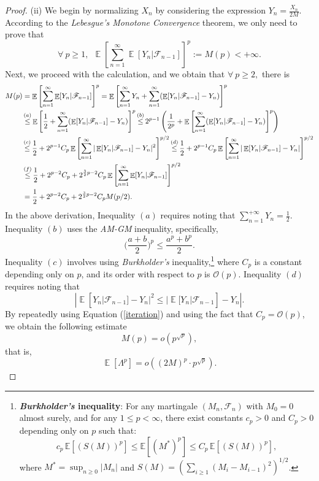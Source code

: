 \documentclass{article} %
\DeclareMathOperator{\Expect}{\mathbb{E}}
\begin{document}
\begin{proof}
(ii) We begin by normalizing \(X_{n}\) by considering the expression \(Y_{n}= \frac{X_{n}}{2M}\). According to the \emph{Lebesgue's Monotone Convergence} theorem, we only need to prove that $$\forall\ p \ge 1,\ \ \Expect\left[\sum_{n=1}^{\infty}\Expect[Y_{n}|\mathscr{F}_{n-1}]\right]^{p}:=M(p)<+\infty.$$
Next, we proceed with the calculation, and we obtain that $\forall\ p\ge 2,$ there is
\begin{align}\label{iteration}
M(p)&=\Expect\left[\sum_{n=1}^{\infty}\Expect[Y_{n}|\mathscr{F}_{n-1}]\right]^{p}= \Expect\left[\sum_{n=1}^{\infty}Y_{n}+\sum_{n=1}^{\infty}(\Expect[Y_{n}|\mathscr{F}_{n-1}]-Y_{n})\right]^{p}\notag\\&\mathop{\le}^{(a)} \Expect\left[\frac{1}{2}+\sum_{n=1}^{\infty}(\Expect[Y_{n}|\mathscr{F}_{n-1}]-Y_{n})\right]^{p}  \mathop{\le}^{(b)}2^{p-1}\left(\frac{1}{2^p}+\Expect\left[\sum_{n=1}^{\infty}(\Expect[Y_{n}|\mathscr{F}_{n-1}]-Y_{n})\right]^{p}\right)\notag\\&\mathop{\le}^{(c)}\frac{1}{2}+2^{p-1}C_{p}\Expect\left[\sum_{n=1}^{\infty}|\Expect[Y_{n}|\mathscr{F}_{n-1}]-Y_{n}|^{2}\right]^{p/2}\mathop{\le}^{(d)}\frac{1}{2}+2^{p-1}C_{p}\Expect\left[\sum_{n=1}^{\infty}|\Expect[Y_{n}|\mathscr{F}_{n-1}]-Y_{n}|\right]^{p/2}\notag\\&\mathop{\le}^{(f)}\frac{1}{2}+2^{p-2}C_{p}+2^{\frac{3}{2}p-2}C_{p}\Expect\left[\sum_{n=1}^{\infty}\Expect[Y_{n}|\mathscr{F}_{n-1}]\right]^{p/2}\notag\\&=\frac{1}{2}+2^{p-2}C_{p}+2^{\frac{3}{2}p-2}C_{p}M(p/2).
\end{align}
In the above derivation, Inequality $(a)$ requires noting that $\sum_{n=1}^{+\infty}Y_{n}=\frac{1}{2}.$ Inequality $(b)$ uses the \emph{AM-GM} inequality, specifically,
\[
\bigg(\frac{a+b}{2}\bigg)^{p} \leq \frac{a^{p} + b^{p}}{2}.
\]
Inequality $(c)$ involves using \emph{Burkholder's} inequality,\footnote{\textbf{\emph{Burkholder's} inequality}:
For any martingale \((M_n, \mathscr{F}_n)\) with \(M_0 = 0\) almost surely, and for any \(1 \leq p < \infty\), there exist constants \(c_p > 0\) and \(C_p > 0\) depending only on \(p\) such that:
\[c_p \, \mathbb{E}[(S(M))^p] \leq \mathbb{E}[(M^*)^p] \leq C_p \, \mathbb{E}[(S(M))^p],\]
where \(M^* = \sup_{n \geq 0} |M_n|\) and \(S(M) = \left( \sum_{i \geq 1} (M_i - M_{i-1})^2 \right)^{1/2}\).} where $C_{p}$ is a constant depending only on $p$, and its order with respect to $p$ is $\mathcal{O}(p)$. Inequality $(d)$ requires noting that $$|\Expect[Y_{n}|\mathscr{F}_{n-1}]-Y_{n}|^{2} \leq |\Expect[Y_{n}|\mathscr{F}_{n-1}]-Y_{n}|.$$
By repeatedly using Equation (\ref{iteration}) and using the fact that $C_{p} = \mathcal{O}(p)$, we obtain the following estimate
\[
M(p) = o(p^{\sqrt{p}}),
\] that is,
    \[\Expect[\Lambda^{p}]=o((2M)^{p}\cdot p^{\sqrt{p}}). \tag*{\qedhere}\]


\end{proof}
\end{document}
